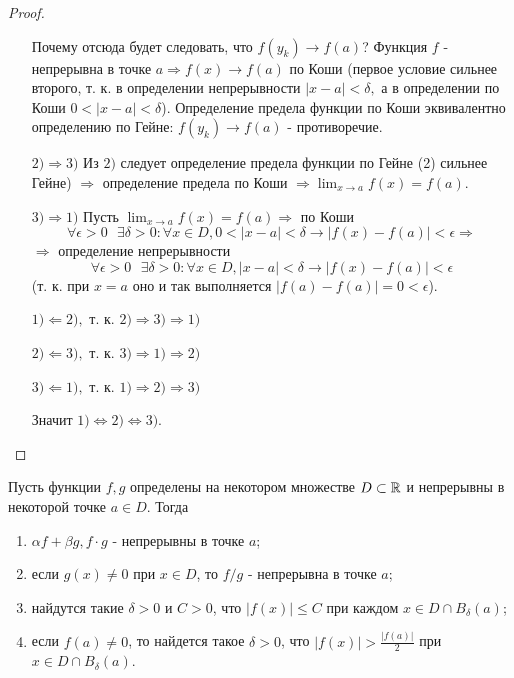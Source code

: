 \begin{proof}
\begin{itemize}
			Почему отсюда будет следовать, что $f(y_k) \to f(a)$? Функция $f$ - непрерывна в точке $a \Rightarrow f(x) \to f(a)$ по Коши (первое условие сильнее второго, т. к. в определении непрерывности $|x - a| < \delta,$ а в определении по Коши $0 < |x - a| < \delta$). Определение предела функции по Коши эквивалентно определению по Гейне: $f(y_k) \to f(a)$ - противоречие.
			\item[$2) \Rightarrow 3)$] Из $2)$ следует определение предела функции по Гейне (2) сильнее Гейне) $\Rightarrow$ определение предела по Коши $\Rightarrow \lim_{x \to a} f(x) = f(a)$.
			\item[$3) \Rightarrow 1)$] Пусть $\lim_{x \to a} f(x) = f(a) \Rightarrow$ по Коши
			\[ \forall \epsilon > 0 \text{ } \exists \delta > 0: \forall x \in D, 0 < |x - a| < \delta \rightarrow |f(x) - f(a)| < \epsilon \Rightarrow \]
			$\Rightarrow$ определение непрерывности
			\[ \forall \epsilon > 0 \text{ } \exists \delta > 0: \forall x \in D, |x - a| < \delta \rightarrow |f(x) - f(a)| < \epsilon \]
			(т. к. при $x = a$ оно и так выполняется $|f(a) - f(a)| = 0 < \epsilon$).
			
			$1) \Leftarrow 2),$ т. к. $2) \Rightarrow 3) \Rightarrow 1)$
			
			$2) \Leftarrow 3),$ т. к. $3) \Rightarrow 1) \Rightarrow 2)$
			
			$3) \Leftarrow 1),$ т. к. $1) \Rightarrow 2) \Rightarrow 3)$
			
			Значит $1) \Leftrightarrow 2) \Leftrightarrow 3).$
		\end{itemize}
	\end{proof}
	
	\begin{sentence}
		Пусть функции $f, g$ определены на некотором множестве $D \subset \mathbb R$ и непрерывны в некоторой точке $a \in D$. Тогда
		\begin{enumerate}
			\item $\alpha f + \beta g, f \cdot g$ - непрерывны в точке $a$;
			\item если $g(x) \neq 0$ при $x \in D$, то $f/g$ - непрерывна в точке $a$;
			\item найдутся такие $\delta > 0$ и $C > 0$, что $|f(x)| \leqslant C$ при каждом $x \in D \cap B_{\delta}(a)$;
			\item если $f(a) \neq 0$, то найдется такое $\delta > 0$, что $|f(x)| > \frac{|f(a)|}{2}$ при $x \in D \cap B_{\delta}(a)$.
		\end{enumerate}
	\end{sentence}
	
